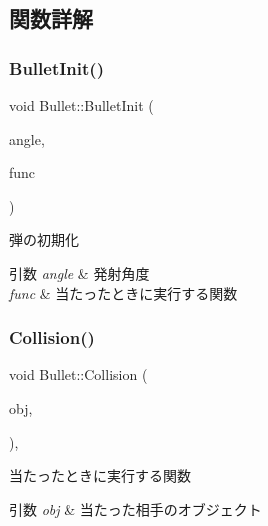 \subsection{関数詳解}
\mbox{\label{class_bullet_ab6b7b4ebc19095372a8e5ef3ad45ff65}} 
\subsubsection{\texorpdfstring{Bullet\+Init()}{BulletInit()}}
{\footnotesize\ttfamily void Bullet\+::\+Bullet\+Init (\begin{DoxyParamCaption}\item[{const float}]{angle,  }\item[{const std\+::function$<$ void()$>$ \&}]{func }\end{DoxyParamCaption})}



弾の初期化 


\begin{DoxyParams}{引数}
{\em angle} & 発射角度 \\
\hline
{\em func} & 当たったときに実行する関数 \\
\hline
\end{DoxyParams}
\mbox{\label{class_bullet_a945da4a16d11cfee31139d564bea61f0}} 
\subsubsection{\texorpdfstring{Collision()}{Collision()}}
{\footnotesize\ttfamily void Bullet\+::\+Collision (\begin{DoxyParamCaption}\item[{\mbox{\hyperlink{class_object_base}{Object\+Base}} $\ast$}]{obj,  }\item[{\mbox{\hyperlink{common_8h_afb0c5e21d4133ff4f200992c0b534e1b}{V\+E\+C2}}}]{ }\end{DoxyParamCaption})\hspace{0.3cm}{\ttfamily [final]}, {\ttfamily [virtual]}}



当たったときに実行する関数 


\begin{DoxyParams}{引数}
{\em obj} & 当たった相手のオブジェクト \\
\hline
\end{DoxyParams}


